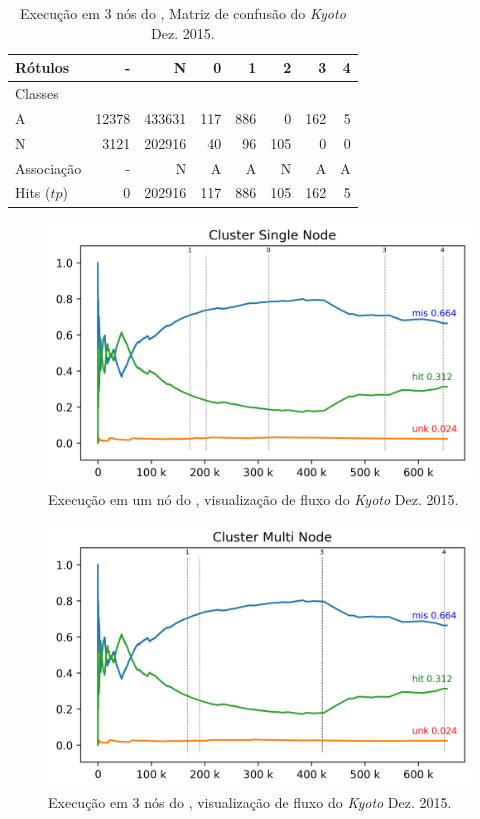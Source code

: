 \begin{table}[hbt]
  \centering
  \caption{Execução em 3 nós do \mfog, Matriz de confusão do \dataset \emph{Kyoto} Dez. 2015.}
  \label{tab:multi-matrix}
  \begin{tabular}{l|r|r|r|r|r|r|r}
    Rótulos   &      - &       N &    0 &    1 &    2 &    3 &  4 \\\hline
    Classes   &        &         &      &      &      &      &    \\\hline
    \hline
    A      &  12378 &  433631 &  117 &  886 &    0 &  162 &  5 \\\hline
    N      &   3121 &  202916 &   40 &   96 &  105 &    0 &  0 \\\hline
    \hline
    Associação   &      - &       N &    A &    A &    N &    A &  A \\\hline
    Hits ($tp$)   &      0 &  202916 &  117 &  886 &  105 &  162 &  5 
  \end{tabular}
\end{table}

\begin{figure}[htb]
  \centering
  \includegraphics[width=0.75\linewidth]{experiments/tmi-base-log.png}
  \caption{Execução em um nó do \mfog, visualização de fluxo do \dataset \emph{Kyoto} Dez. 2015.}
  \label{fig:single-flow}
\end{figure}


\begin{figure}[htb]
  \centering
  \includegraphics[width=0.75\linewidth]{experiments/tmi-n12-log.png}
  \caption{Execução em 3 nós do \mfog, visualização de fluxo do \dataset \emph{Kyoto} Dez. 2015.}
  \label{fig:multi-flow}
\end{figure}

